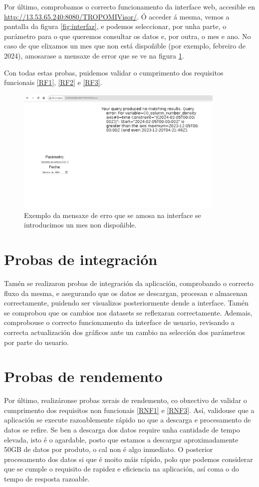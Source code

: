 Por último, comprobamos o correcto funcionamento da interface web, accesible en \url{http://13.53.65.240:8080/TROPOMIVisor/}. Ó acceder á mesma, vemos a pantalla da figura \ref{fig:interfaz}, e
podemos seleccionar, por unha parte, o parámetro para o que queremos consultar os datos e, por outra, o mes e ano. No caso de que elixamos un mes que non está dispoñible (por exemplo, febreiro de
2024), amosarase a mensaxe de error que se ve na figura \ref{fig:interfazError}.

Con todas estas probas, puidemos validar o cumprimento dos requisitos funcionais \hyperref[rf1]{[RF1]}, \hyperref[rf2]{[RF2]} e \hyperref[rf3]{[RF3]}.

\begin{figure}
    \centerline{\includegraphics[width=10cm]{figuras/interfazError.png}}
    \caption{Exemplo da mensaxe de erro que se amosa na interface se introducimos un mes non dispoñible.}
    \label{fig:interfazError}
\end{figure}

\section{Probas de integración}\label{integracion}
Tamén se realizaron probas de integración da aplicación, comprobando o correcto fluxo da mesma, e asegurando que os datos se descargan, procesan e almacenan correctamente, puidendo ser visualizos
posteriormente dende a interface. Tamén se comprobou que os cambios nos datasets se reflexaran correctamente. Ademais, comprobouse o correcto funcionamento da interface de usuario, revisando a
correcta actualización dos gráficos ante un cambio na selección dos parámetros por parte do usuario.

\section{Probas de rendemento}\label{rendemento}
Por último, realizáronse probas xerais de rendemento, co obxectivo de validar o cumprimento dos requisitos non funcionais \hyperref[rnf1]{[RNF1]} e \hyperref[rnf3]{[RNF3]}. Así, validouse que a
aplicación se execute razoablemente rápido no que a descarga e procesamento de datos se refire. Se ben a descarga dos datos require unha cantidade de tempo elevada, isto é o agardable, posto que
estamos a descargar aproximadamente 50GB de datos por produto, o cal non é algo inmediato. O posterior procesamento dos datos si que é moito máis rápido, polo que podemos considerar que se cumple o
requisito de rapidez e eficiencia na aplicación, así coma o do tempo de resposta razoable.

